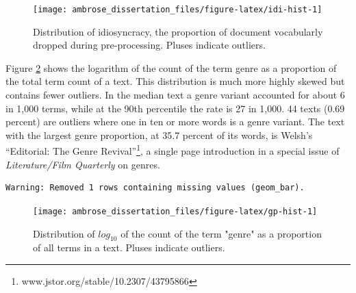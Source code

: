 \documentclass[]{book}
\let\rmarkdownfootnote\footnote%
\def\footnote{\protect\rmarkdownfootnote}
\theoremstyle{definition}
\theoremstyle{definition}
\theoremstyle{definition}
\theoremstyle{remark}
\begin{document}
\begin{figure}

{\centering \texttt{[image: ambrose\_dissertation\_files/figure-latex/idi-hist-1]} 

}

\caption{Distribution of idiosyncracy, the proportion of document vocabularly dropped during pre-processing. Pluses indicate outliers.}\label{fig:idi-hist}
\end{figure}

Figure \ref{fig:gp-hist} shows the logarithm of the count of the term
genre as a proportion of the total term count of a text. This
distribution is much more highly skewed but contains fewer outliers. In
the median text a genre variant accounted for about 6 in 1,000 terms,
while at the 90th percentile the rate is 27 in 1,000. 44 texts (0.69
percent) are outliers where one in ten or more words is a genre variant.
The text with the largest genre proportion, at 35.7 percent of its
words, is Welsh's ``Editorial: The Genre Revival''\footnote{www.jstor.org/stable/10.2307/43795866},
a single page introduction in a special issue of \emph{Literature/Film
Quarterly} on genres.

\begin{verbatim}
Warning: Removed 1 rows containing missing values (geom_bar).
\end{verbatim}

\begin{figure}

{\centering \texttt{[image: ambrose\_dissertation\_files/figure-latex/gp-hist-1]} 

}

\caption{Distribution of $log_{10}$ of the count of the term "genre" as a proportion of all terms in a text. Pluses indicate outliers.}\label{fig:gp-hist}
\end{figure}
\end{document}
